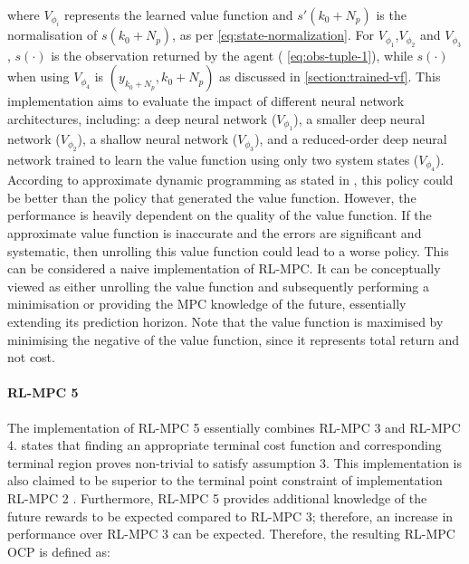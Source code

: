 where $V_{\phi_i}$ represents the learned value function and $s'(k_0+N_p)$ is the normalisation of $s(k_0+N_p)$, as per \autoref{eq:state-normalization}. For $V_{\phi_1}$,$V_{\phi_2}$ and $V_{\phi_3}$, $s(\cdot)$ is the observation returned by the agent ( \autoref{eq:obs-tuple-1}), while $s(\cdot)$ when using $V_{\phi_4}$ is $(y_{k_0+N_p},k_0+N_p)$ as discussed in \autoref{section:trained-vf}. This implementation aims to evaluate the impact of different neural network architectures, including: a deep neural network ($V_{\phi_1}$), a smaller deep neural network ($V_{\phi_2}$), a shallow neural network ($V_{\phi_3}$), and a reduced-order deep neural network trained to learn the value function using only two system states ($V_{\phi_4}$). According to approximate dynamic programming as stated in \cite{bertsekasLessonsAlphaZeroOptimal}, this policy could be better than the policy that generated the value function. However, the performance is heavily dependent on the quality of the value function. If the approximate value function is inaccurate and the errors are significant and systematic, then unrolling this value function could lead to a worse policy. This can be considered a naive implementation of RL-MPC. It can be conceptually viewed as either unrolling the value function and subsequently performing a minimisation or providing the MPC knowledge of the future, essentially extending its prediction horizon. Note that the value function is maximised by minimising the negative of the value function, since it represents total return and not cost.

\paragraph{RL-MPC 5}
The implementation of RL-MPC 5 essentially combines RL-MPC 3 and RL-MPC 4. \citet{amritEconomicOptimizationUsing2011} states that finding an appropriate terminal cost function and corresponding terminal region proves non-trivial  to satisfy assumption 3. This implementation is also claimed to be superior to the terminal point constraint of implementation RL-MPC 2 \cite{amritEconomicOptimizationUsing2011}. Furthermore, RL-MPC 5 provides additional knowledge of the future rewards to be expected compared to RL-MPC 3; therefore, an increase in performance over RL-MPC 3 can be expected. Therefore, the resulting RL-MPC OCP is defined as:

